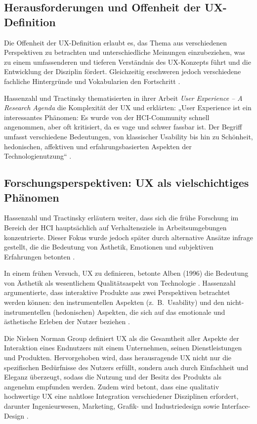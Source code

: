 \documentclass[12pt,oneside]{article}
\begin{document}
\subsection{Herausforderungen und Offenheit der UX-Definition}

Die Offenheit der UX-Definition erlaubt es, das Thema aus verschiedenen Perspektiven zu betrachten und unterschiedliche Meinungen einzubeziehen, was zu einem umfassenderen und tieferen Verständnis des UX-Konzepts führt und die Entwicklung der Disziplin fördert. Gleichzeitig erschweren jedoch verschiedene fachliche Hintergründe und Vokabularien den Fortschritt \cite{glanznig}.

Hassenzahl und Tractinsky thematisierten in ihrer Arbeit \textit{User Experience – A Research Agenda} die Komplexität der UX und erklärten: „User Experience ist ein interessantes Phänomen: Es wurde von der HCI-Community schnell angenommen, aber oft kritisiert, da es vage und schwer fassbar ist. Der Begriff umfasst verschiedene Bedeutungen, von klassischer Usability bis hin zu Schönheit, hedonischen, affektiven und erfahrungsbasierten Aspekten der Technologienutzung“ \cite{research}.

\subsection{Forschungsperspektiven: UX als vielschichtiges Phänomen}

Hassenzahl und Tractinsky erläutern weiter, dass sich die frühe Forschung im Bereich der HCI hauptsächlich auf Verhaltensziele in Arbeitsumgebungen konzentrierte. Dieser Fokus wurde jedoch später durch alternative Ansätze infrage gestellt, die die Bedeutung von Ästhetik, Emotionen und subjektiven Erfahrungen betonten \cite{research}.

In einem frühen Versuch, UX zu definieren, betonte Alben (1996) die Bedeutung von Ästhetik als wesentlichem Qualitätsaspekt von Technologie \cite{research}. Hassenzahl argumentierte, dass interaktive Produkte aus zwei Perspektiven betrachtet werden können: den instrumentellen Aspekten (z.~B.\ Usability)
 und den nicht-instrumentellen (hedonischen) Aspekten, die sich auf das emotionale und ästhetische Erleben der Nutzer beziehen \cite{hassenzahl2003}.

Die Nielsen Norman Group definiert UX als die Gesamtheit aller Aspekte der Interaktion eines Endnutzers mit einem Unternehmen, seinen Dienstleistungen und Produkten. Hervorgehoben wird, dass herausragende UX nicht nur die spezifischen Bedürfnisse des Nutzers erfüllt, sondern auch durch Einfachheit und Eleganz überzeugt, sodass die Nutzung und der Besitz des Produkts als angenehm empfunden werden. Zudem wird betont, dass eine qualitativ hochwertige UX eine nahtlose Integration verschiedener Disziplinen erfordert, darunter Ingenieurwesen, Marketing, Grafik- und Industriedesign sowie Interface-Design \cite{nngroup}.
\end{document}
